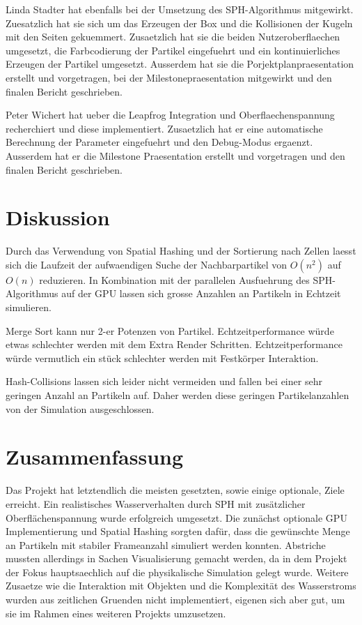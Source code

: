 \documentclass[a4paper]{paper}
\begin{document}
Linda Stadter hat ebenfalls bei der Umsetzung des SPH-Algorithmus mitgewirkt. Zuesatzlich hat sie sich um das Erzeugen der Box und die Kollisionen der Kugeln mit den Seiten gekuemmert. Zusaetzlich hat sie die beiden Nutzeroberflaechen umgesetzt, die Farbcodierung der Partikel eingefuehrt und ein kontinuierliches Erzeugen der Partikel umgesetzt. Ausserdem hat sie die Porjektplanpraesentation erstellt und vorgetragen, bei der Milestonepraesentation mitgewirkt und den finalen Bericht geschrieben.

Peter Wichert hat ueber die Leapfrog Integration und Oberflaechenspannung recherchiert und diese implementiert. Zusaetzlich hat er eine automatische Berechnung der Parameter eingefuehrt und den Debug-Modus ergaenzt. Ausserdem hat er die Milestone Praesentation erstellt und vorgetragen und den finalen Bericht geschrieben.



\section{Diskussion}
Durch das Verwendung von Spatial Hashing und der Sortierung nach Zellen laesst sich die Laufzeit der aufwaendigen Suche der Nachbarpartikel von $O(n^2)$ auf $O(n)$ reduzieren.
In Kombination mit der parallelen Ausfuehrung des SPH-Algorithmus auf der GPU lassen sich grosse Anzahlen an Partikeln in Echtzeit simulieren.

Merge Sort kann nur 2-er Potenzen von Partikel.
Echtzeitperformance würde etwas schlechter werden mit dem Extra Render Schritten.
Echtzeitperformance würde vermutlich ein stück schlechter werden mit Festkörper Interaktion. 


Hash-Collisions lassen sich leider nicht vermeiden und fallen bei einer sehr geringen Anzahl an Partikeln auf. Daher werden diese geringen Partikelanzahlen von der Simulation ausgeschlossen.
\section{Zusammenfassung}

Das Projekt hat letztendlich die meisten gesetzten, sowie einige optionale, Ziele erreicht. Ein realistisches Wasserverhalten durch SPH mit zusätzlicher Oberflächenspannung wurde erfolgreich umgesetzt. Die zunächst optionale GPU Implementierung und Spatial Hashing sorgten dafür, dass die gewünschte Menge an Partikeln mit stabiler Frameanzahl simuliert werden konnten. Abstriche mussten allerdings in Sachen Visualisierung gemacht werden, da in dem Projekt der Fokus hauptsaechlich auf die physikalische Simulation gelegt wurde. Weitere Zusaetze wie die Interaktion mit Objekten und die Komplexität des Wasserstroms wurden aus zeitlichen Gruenden nicht implementiert, eigenen sich aber gut, um sie im Rahmen eines weiteren Projekts umzusetzen.




\end{document}
